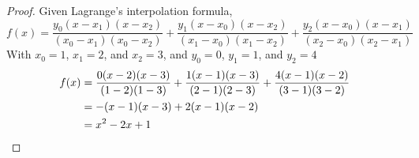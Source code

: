 \documentclass[paper=usletter, fontsize=12pt]{article}
\begin{document}
\begin{itemize}
\begin{enumerate}
\begin{proof}
                Given Lagrange's interpolation formula,
                \begin{equation*}
                    f(x)=\frac{y_0(x-x_1)(x-x_2)}{(x_0-x_1)(x_0-x_2)}+\frac{y_1(x-x_0)(x-x_2)}{(x_1-x_0)(x_1-x_2)}+\frac{y_2(x-x_0)(x-x_1)}{(x_2-x_0)(x_2-x_1)}
                \end{equation*}
                With $x_0=1$, $x_1=2$, and $x_2=3$, and $y_0=0$, $y_1=1$, and $y_2=4$\\
                \begin{align*}
                    f(x)&=\frac{0(x-2)(x-3)}{(1-2)(1-3)}+\frac{1(x-1)(x-3)}{(2-1)(2-3)}+\frac{4(x-1)(x-2)}{(3-1)(3-2)}\\
                    &=-(x-1)(x-3)+2(x-1)(x-2)\\
                    &=x^2-2x+1 \qedhere
                \end{align*}

            \end{proof}

        \end{enumerate}

    \end{itemize}
\end{document}
